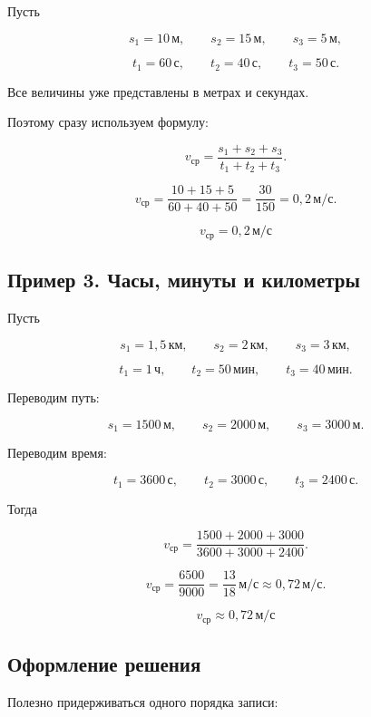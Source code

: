 \documentclass[a4paper,12pt]{article}
\newcommand{\avgv}{v_{\text{ср}}}
\newcommand{\unit}[1]{\,\text{#1}}
\begin{document}
Пусть

\[
s_1=10\unit{м},
\qquad
s_2=15\unit{м},
\qquad
s_3=5\unit{м},
\]

\[
t_1=60\unit{с},
\qquad
t_2=40\unit{с},
\qquad
t_3=50\unit{с}.
\]

Все величины уже представлены в метрах и секундах.

Поэтому сразу используем формулу:

\[
\avgv=
\frac{s_1+s_2+s_3}
     {t_1+t_2+t_3}.
\]

\[
\avgv=
\frac{10+15+5}
     {60+40+50}
=
\frac{30}{150}
=
0{,}2\unit{м/с}.
\]

\[
\boxed{\avgv=0{,}2\unit{м/с}}
\]

\subsection*{Пример 3. Часы, минуты и километры}

Пусть

\[
s_1=1{,}5\unit{км},
\qquad
s_2=2\unit{км},
\qquad
s_3=3\unit{км},
\]

\[
t_1=1\unit{ч},
\qquad
t_2=50\unit{мин},
\qquad
t_3=40\unit{мин}.
\]

Переводим путь:

\[
s_1=1500\unit{м},
\qquad
s_2=2000\unit{м},
\qquad
s_3=3000\unit{м}.
\]

Переводим время:

\[
t_1=3600\unit{с},
\qquad
t_2=3000\unit{с},
\qquad
t_3=2400\unit{с}.
\]

Тогда

\[
\avgv=
\frac{1500+2000+3000}
     {3600+3000+2400}.
\]

\[
\avgv=
\frac{6500}{9000}
=
\frac{13}{18}\unit{м/с}
\approx
0{,}72\unit{м/с}.
\]

\[
\boxed{
\avgv\approx0{,}72\unit{м/с}
}
\]

\subsection*{Оформление решения}

Полезно придерживаться одного порядка записи:
\end{document}
